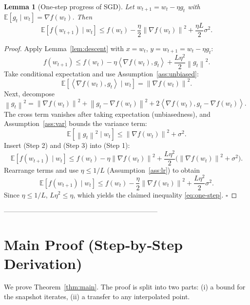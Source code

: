 \documentclass{article}
\newtheorem{lemma}{Lemma}
\newcommand{\EE}{\mathbb{E}}
\newcommand{\norm}[1]{\left\|#1\right\|}
\newcommand{\inner}[2]{\left\langle #1,#2\right\rangle}
\begin{document}
\begin{lemma}[One‑step progress of SGD]\label{lem:sgd-one}
Let $w_{t+1}=w_t-\eta g_t$ with $\EE[g_t\mid w_t]=\nabla f(w_t)$. Then
\begin{equation}
\EE\!\left[f(w_{t+1})\mid w_t\right]
\le f(w_t)-\frac{\eta}{2}\norm{\nabla f(w_t)}^2
      +\frac{\eta L}{2}\sigma^2 .
\label{eq:one-step}
\end{equation}
\end{lemma}
\begin{proof}
Apply Lemma~\ref{lem:descent} with $x=w_t$, $y=w_{t+1}=w_t-\eta g_t$:
\[
f(w_{t+1})\le f(w_t)-\eta\inner{\nabla f(w_t)}{g_t}
               +\frac{L\eta^2}{2}\norm{g_t}^2 .
\tag{Step 1}
\]
Take conditional expectation and use Assumption~\ref{ass:unbiased}:
\[
\EE\!\left[\inner{\nabla f(w_t)}{g_t}\mid w_t\right]
      =\norm{\nabla f(w_t)}^2 .
\tag{Step 2}
\]
Next, decompose $\norm{g_t}^2=\norm{\nabla f(w_t)}^2
        +\norm{g_t-\nabla f(w_t)}^2
        +2\inner{\nabla f(w_t)}{g_t-\nabla f(w_t)}$.
The cross term vanishes after taking expectation (unbiasedness), and
Assumption~\ref{ass:var} bounds the variance term:
\[
\EE\!\left[\norm{g_t}^2\mid w_t\right]
\le \norm{\nabla f(w_t)}^2+\sigma^2 .
\tag{Step 3}
\]
Insert (Step 2) and (Step 3) into (Step 1):
\[
\EE\!\left[f(w_{t+1})\mid w_t\right]
\le f(w_t)-\eta\norm{\nabla f(w_t)}^2
    +\frac{L\eta^2}{2}\bigl(\norm{\nabla f(w_t)}^2+\sigma^2\bigr).
\]
Rearrange terms and use $\eta\le 1/L$ (Assumption~\ref{ass:lr}) to obtain
\[
\EE\!\left[f(w_{t+1})\mid w_t\right]
\le f(w_t)-\frac{\eta}{2}\norm{\nabla f(w_t)}^2
    +\frac{L\eta^2}{2}\sigma^2 .
\]
Since $\eta\le 1/L$, $L\eta^2\le\eta$, which yields the claimed inequality \eqref{eq:one-step}. \hfill $\square$
\end{proof}

--------------------------------------------------------------------

\section*{Main Proof (Step‑by‑Step Derivation)}
We prove Theorem~\ref{thm:main}. The proof is split into two parts: (i) a bound for the snapshot iterates, (ii) a transfer to any interpolated point.
\end{document}
